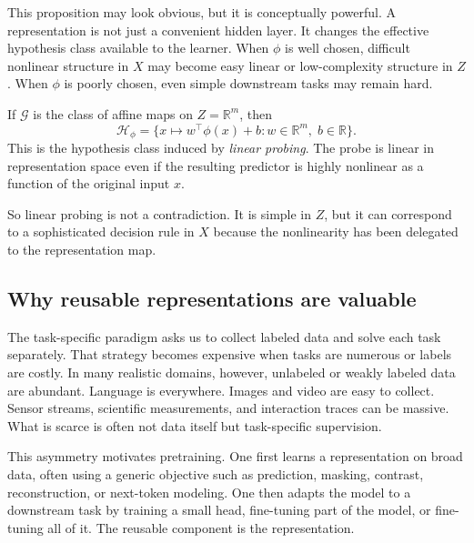 This proposition may look obvious, but it is conceptually powerful.
A representation is not just a convenient hidden layer.
It changes the effective hypothesis class available to the learner.
When \(\phi\) is well chosen, difficult nonlinear structure in \(X\) may become easy linear or low-complexity structure in \(Z\).
When \(\phi\) is poorly chosen, even simple downstream tasks may remain hard.

\begin{example}
If \(\mathcal{G}\) is the class of affine maps on \(Z = \mathbb{R}^m\), then
\[
\mathcal{H}_{\phi}
=
\{x \mapsto w^{\top}\phi(x) + b : w \in \mathbb{R}^m,\; b \in \mathbb{R}\}.
\]
This is the hypothesis class induced by \emph{linear probing}.
The probe is linear in representation space even if the resulting predictor is highly nonlinear as a function of the original input \(x\).
\end{example}

So linear probing is not a contradiction.
It is simple in \(Z\), but it can correspond to a sophisticated decision rule in \(X\) because the nonlinearity has been delegated to the representation map.

\subsection*{Why reusable representations are valuable}

The task-specific paradigm asks us to collect labeled data and solve each task separately.
That strategy becomes expensive when tasks are numerous or labels are costly.
In many realistic domains, however, unlabeled or weakly labeled data are abundant.
Language is everywhere.
Images and video are easy to collect.
Sensor streams, scientific measurements, and interaction traces can be massive.
What is scarce is often not data itself but task-specific supervision.

This asymmetry motivates pretraining.
One first learns a representation on broad data, often using a generic objective such as prediction, masking, contrast, reconstruction, or next-token modeling.
One then adapts the model to a downstream task by training a small head, fine-tuning part of the model, or fine-tuning all of it.
The reusable component is the representation.

